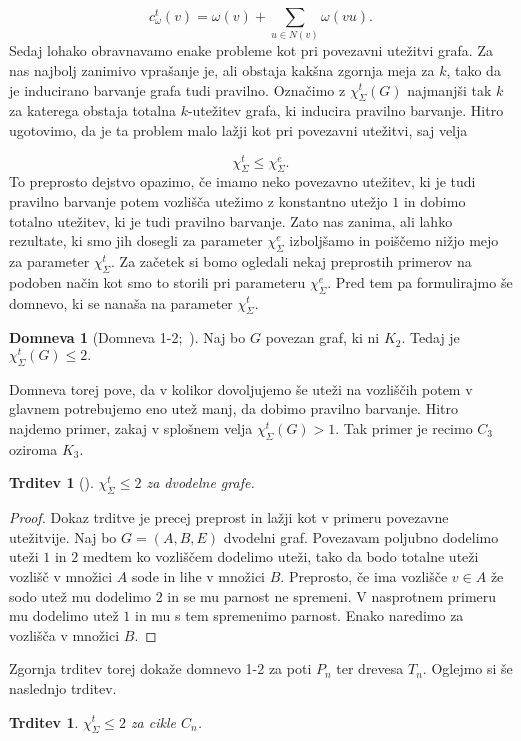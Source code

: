 \documentclass[12pt,a4paper,twoside]{article}
\theoremstyle{definition} %
\newtheorem{domneva}[definicija]{Domneva}
\theoremstyle{plain} %
\newtheorem{trditev}[definicija]{Trditev}
\newcommand{\ec}{\chi_{\Sigma}^e}
\newcommand{\ect}{\chi_{\Sigma}^t}
\numberwithin{equation}{section}  %
\begin{document}
$$c_{\omega}^t(v)  = \omega(v) +  \sum_{u \in N(v)} \omega(vu).$$
Sedaj lohako obravnavamo enake probleme kot pri povezavni utežitvi grafa. Za nas najbolj zanimivo vprašanje je, ali obstaja kakšna zgornja meja za $k$, tako da je inducirano barvanje grafa tudi pravilno. Označimo z $\ect(G)$ najmanjši tak $k$ za katerega obstaja totalna $k$-utežitev grafa, ki inducira pravilno barvanje. Hitro ugotovimo, da je ta problem malo lažji kot pri povezavni utežitvi, saj velja

$$ \ect \le \ec. $$
To preprosto dejstvo opazimo, če imamo neko povezavno utežitev, ki je tudi pravilno barvanje potem vozlišča utežimo z konstantno utežjo $1$ in dobimo totalno utežitev, ki je tudi pravilno barvanje. Zato nas zanima, ali lahko rezultate, ki smo jih dosegli za parameter $\ec$ izboljšamo in poiščemo nižjo mejo za parameter $\ect$.
Za začetek si bomo ogledali nekaj preprostih primerov na podoben način kot smo to storili pri parameteru $\ec$. Pred tem pa formulirajmo še domnevo, ki se nanaša na parameter $\ect$.
\begin{domneva} [Domneva 1-2;~\citet{12conj}]
	\label{12conjecture}
	Naj bo $G$ povezan graf, ki ni $K_2$. Tedaj je $\ect(G) \le 2.$ 
\end{domneva}
Domneva torej pove, da v kolikor dovoljujemo še uteži na vozliščih potem v glavnem potrebujemo eno utež manj, da dobimo pravilno barvanje. Hitro najdemo primer, zakaj v splošnem velja $\ect(G) > 1$. Tak primer je recimo $C_3$ oziroma $K_3$.
\begin{trditev}[\citet{12conj}]
\label{total_dvo}
$\ect \le 2$ za dvodelne grafe.
\end{trditev}
\begin{proof}
Dokaz trditve je precej preprost in lažji kot v primeru povezavne utežitvije. Naj bo $G = (A,B, E)$ dvodelni graf. Povezavam  poljubno dodelimo uteži $1$ in $2$ medtem ko vozliščem dodelimo uteži, tako da bodo totalne uteži vozlišč v množici $A$ sode in lihe v množici $B$. Preprosto, če ima vozlišče $v \in A$ že sodo utež mu dodelimo $2$ in se mu parnost ne spremeni. V nasprotnem primeru mu dodelimo utež $1$ in mu s tem spremenimo parnost. Enako naredimo za vozlišča v množici $B$.
\end{proof}
Zgornja trditev torej dokaže domnevo 1-2 za poti $P_n$ ter drevesa $T_n$. Oglejmo si še naslednjo trditev.
\begin{trditev}
\label{total_cycle}
$\ect \le 2$ za cikle $C_n$.
\end{trditev}
\end{document}
